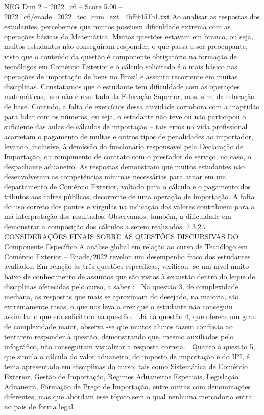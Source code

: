 \begin{textsample}{NEG Dim 2 – 2022\_c6 – Score 5.00 – 2022\_c6/enade\_2022\_tec\_com\_ext\_4bf6f451b1.txt}
Ao analisar as respostas dos estudantes, percebemos que muitos possuem dificuldade extrema com as operações básicas da Matemática.
Muitas questões estavam em branco, ou seja, muitos estudantes não conseguiram responder, o que passa a ser preocupante, visto que o conteúdo da questão é componente obrigatório na formação de tecnólogos em Comércio Exterior e o cálculo solicitado é o mais básico nas operações de importação de bens no Brasil e assunto recorrente em muitas disciplinas.
Constatamos que o estudante tem dificuldade com as operações matemáticas, isso não é resultado da Educação Superior, mas, sim, da educação de base.
Contudo, a falta de exercícios dessa atividade corrobora com a inaptidão para lidar com os números, ou seja, o estudante não teve ou não participou o suficiente das aulas de cálculos de importação – tais erros na vida profissional acarretam o pagamento de multas e outros tipos de penalidades ao importador, levando, inclusive, à demissão do funcionário responsável pela Declaração de Importação, ou rompimento de contrato com o prestador de serviço, no caso, o despachante aduaneiro.
As respostas demonstram que muitos estudantes não desenvolveram as competências mínimas necessárias para atuar em um departamento de Comércio Exterior, voltado para o cálculo e o pagamento dos tributos aos cofres públicos, decorrente de uma operação de importação.
A falta do uso correto dos pontos e vírgulas na indicação dos valores contribuem para a má interpretação dos resultados.
Observamos, também, a dificuldade em demonstrar a composição dos cálculos a serem realizados. 7.3.2.7 CONSIDERAÇÕES FINAIS SOBRE AS QUESTÕES DISCURSIVAS DO Componente Específico A análise global em relação ao curso de Tecnólogo em Comércio Exterior – Enade/2022 revelou um desempenho fraco dos estudantes avaliados.
Em relação às três questões específicas, verificou -se um nível muito baixo de conhecimento de assuntos que são vistos à exaustão dentro do leque de disciplinas oferecidas pelo curso, a saber :  Na questão 3, de complexidade mediana, as respostas que mais se aproximam do desejado, na maioria, são extremamente rasas, o que nos leva a crer que o estudante não conseguiu assimilar o que era solicitado na questão.  Já na questão 4, que oferece um grau de complexidade maior, observa -se que muitos alunos fazem confusão ao tentarem responder à questão, demonstrando que, mesmo auxiliados pelo infográfico, não conseguiram visualizar a resposta correta.  Quanto à questão 5, que simula o cálculo do valor aduaneiro, do imposto de importação e do IPI, é tema apresentado em disciplinas do curso, tais como Sistemática de Comércio Exterior, Gestão de Importação, Regimes Aduaneiros Especiais, Legislação Aduaneira, Formação de Preço de Importação, entre outras com denominações diferentes, mas que abordam esse tópico sem o qual nenhuma mercadoria entra no país de forma legal.

\end{textsample}
